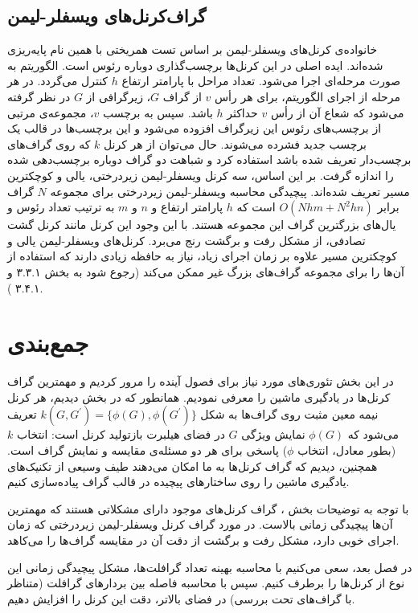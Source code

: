 \subsection{گراف‌کرنل‌های ویسفلر-لیمن}\label{sec:weisfeiler-lehman-kernels}
 خانواده‌ی کرنل‌های ویسفلر-لیمن بر اساس تست همریختی با همین نام پایه‌ریزی شده‌اند. ایده اصلی در این کرنل‌ها برچسب‌گذاری دوباره رئوس است. الگوریتم به صورت مرحله‌ای اجرا می‌شود. تعداد مراحل با پارامتر ارتفاع $h$ کنترل می‌گردد. در هر مرحله از اجرای الگوریتم، برای هر رأس $v$ از گراف $G$، زیرگرافی از $G$ در نظر گرفته می‌شود که شعاع آن از رأس $v$ حداکثر $h$ باشد. سپس به برچسب $v$، مجموعه‌ی مرتبی از برچسب‌های رئوس این زیرگراف افزوده می‌شود و این برچسب‌ها در قالب یک برچسب جدید فشرده می‌شوند. حال می‌توان از هر کرنل $k$ که روی گراف‌های برچسب‌دار تعریف شده باشد استفاده کرد و شباهت دو گراف دوباره برچسب‌دهی شده را اندازه گرفت. بر این اساس، سه کرنل ویسفلر-لیمن زیردرختی، یالی و کوچکترین مسیر تعریف شده‌اند. پیچیدگی محاسبه ویسفلر-لیمن زیردرختی برای مجموعه $N$ گراف برابر  $O(Nhm+N^2hn)$ است که $h$ پارامتر ارتفاع و $n$ و $m$ به ترتیب تعداد رئوس و یال‌های بزرگترین گراف این مجموعه هستند. با این وجود این کرنل مانند کرنل گشت تصادفی، از مشکل رفت و برگشت رنج می‌برد. کرنل‌های ویسفلر-لیمن یالی و کوچکترین مسیر علاوه بر زمان اجرای زیاد، نیاز به حافظه زیادی دارند که استفاده از آن‌ها را برای مجموعه گراف‌های بزرگ غیر ممکن می‌کند (رجوع شود به بخش ۳.۳.۱ و ۳.۴.۱ ).
 
\section{جمع‌بندی}
در این بخش تئوری‌های مورد نیاز برای فصول آینده را مرور کردیم و مهمترین گراف کرنل‌ها در یادگیری ماشین را معرفی نمودیم. همانطور که در بخش‌  دیدیم، هر کرنل نیمه معین مثبت روی گراف‌ها به شکل $k(G,G^\prime) = \lbrace{\phi(G),\phi(G^\prime)}\rbrace$ تعریف می‌شود که $\phi(G)$ نمایش ویژگی $G$ در فضای هیلبرت بازتولید کرنل است: انتخاب $k$ (بطور معادل، انتخاب $\phi$) پاسخی برای هر دو مسئله‌ی مقایسه و نمایش گراف است. همچنین، دیدیم که گراف کرنل‌ها به ما امکان می‌دهند طیف وسیعی از تکنیک‌های یادگیری ماشین را روی ساختارهای پیچیده در قالب گراف پیاده‌سازی کنیم.

با توجه به توضیحات بخش ، گراف کرنل‌های موجود دارای مشکلاتی هستند که مهمترین آن‌ها پیچیدگی زمانی بالاست. در مورد گراف کرنل ویسفلر-لیمن زیردرختی که زمان اجرای خوبی دارد، مشکل رفت و برگشت از دقت آن در مقایسه گراف‌ها را می‌کاهد.

در فصل بعد، سعی می‌کنیم با محاسبه بهینه تعداد گرافلت‌ها، مشکل پیچیدگی زمانی این نوع از کرنل‌ها را برطرف کنیم. سپس با محاسبه فاصله بین بردارهای گرافلت (متناظر با گراف‌های تحت بررسی) در فضای بالاتر، دقت این کرنل را افزایش دهیم.
